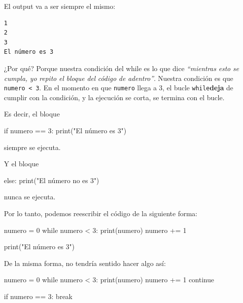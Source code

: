 \documentclass[
  letterpaper,
  DIV=11,
  numbers=noendperiod]{scrreprt}
\newenvironment{Shaded}{\begin{snugshade}}{\end{snugshade}}
\newcommand{\BuiltInTok}[1]{\textcolor[rgb]{0.00,0.23,0.31}{#1}}
\newcommand{\ControlFlowTok}[1]{\textcolor[rgb]{0.00,0.23,0.31}{#1}}
\newcommand{\DecValTok}[1]{\textcolor[rgb]{0.68,0.00,0.00}{#1}}
\newcommand{\NormalTok}[1]{\textcolor[rgb]{0.00,0.23,0.31}{#1}}
\newcommand{\OperatorTok}[1]{\textcolor[rgb]{0.37,0.37,0.37}{#1}}
\newcommand{\StringTok}[1]{\textcolor[rgb]{0.13,0.47,0.30}{#1}}
\begin{document}
El output va a ser siempre el mismo:

\begin{verbatim}
1
2
3
El número es 3
\end{verbatim}

¿Por qué? Porque nuestra condición del while es lo que dice
\emph{``mientras esto se cumpla, yo repito el bloque del código de
adentro''}. Nuestra condición es que \texttt{numero\ \textless{}\ 3}. En
el momento en que \texttt{numero} llega a 3, el bucle
\texttt{while}\textbf{deja} de cumplir con la condición, y la ejecución
se corta, se termina con el bucle.

Es decir, el bloque

\begin{Shaded}
\begin{Highlighting}[]
\ControlFlowTok{if}\NormalTok{ numero }\OperatorTok{==} \DecValTok{3}\NormalTok{:}
  \BuiltInTok{print}\NormalTok{(}\StringTok{"El número es 3"}\NormalTok{)}
\end{Highlighting}
\end{Shaded}

siempre se ejecuta.

Y el bloque

\begin{Shaded}
\begin{Highlighting}[]
\ControlFlowTok{else}\NormalTok{:}
  \BuiltInTok{print}\NormalTok{(}\StringTok{"El número no es 3"}\NormalTok{)}
\end{Highlighting}
\end{Shaded}

nunca se ejecuta.

Por lo tanto, podemos reescribir el código de la siguiente forma:

\begin{Shaded}
\begin{Highlighting}[]
\NormalTok{numero }\OperatorTok{=} \DecValTok{0}
\ControlFlowTok{while}\NormalTok{ numero }\OperatorTok{\textless{}} \DecValTok{3}\NormalTok{:}
  \BuiltInTok{print}\NormalTok{(numero)}
\NormalTok{  numero }\OperatorTok{+=} \DecValTok{1}

\BuiltInTok{print}\NormalTok{(}\StringTok{"El número es 3"}\NormalTok{)}
\end{Highlighting}
\end{Shaded}

\hfill\break
De la misma forma, no tendría sentido hacer algo así:

\begin{Shaded}
\begin{Highlighting}[]
\NormalTok{numero }\OperatorTok{=} \DecValTok{0} 
\ControlFlowTok{while}\NormalTok{ numero }\OperatorTok{\textless{}} \DecValTok{3}\NormalTok{:}
  \BuiltInTok{print}\NormalTok{(numero)}
\NormalTok{  numero }\OperatorTok{+=} \DecValTok{1}
  \ControlFlowTok{continue}

  \ControlFlowTok{if}\NormalTok{ numero }\OperatorTok{==} \DecValTok{3}\NormalTok{:}
    \ControlFlowTok{break}
\end{Highlighting}
\end{Shaded}
\end{document}
